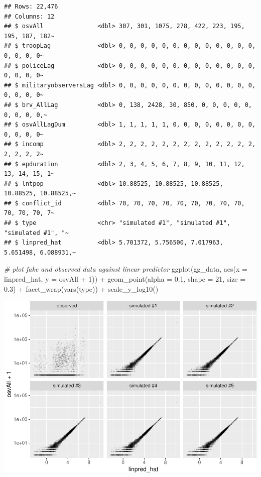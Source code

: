 \documentclass[
]{book}
\newenvironment{Shaded}{\begin{snugshade}}{\end{snugshade}}
\newcommand{\AttributeTok}[1]{\textcolor[rgb]{0.77,0.63,0.00}{#1}}
\newcommand{\CommentTok}[1]{\textcolor[rgb]{0.56,0.35,0.01}{\textit{#1}}}
\newcommand{\DecValTok}[1]{\textcolor[rgb]{0.00,0.00,0.81}{#1}}
\newcommand{\FloatTok}[1]{\textcolor[rgb]{0.00,0.00,0.81}{#1}}
\newcommand{\FunctionTok}[1]{\textcolor[rgb]{0.00,0.00,0.00}{#1}}
\newcommand{\NormalTok}[1]{#1}
\newcommand{\SpecialCharTok}[1]{\textcolor[rgb]{0.00,0.00,0.00}{#1}}
\begin{document}
\begin{verbatim}
## Rows: 22,476
## Columns: 12
## $ osvAll               <dbl> 307, 301, 1075, 278, 422, 223, 195, 195, 187, 182~
## $ troopLag             <dbl> 0, 0, 0, 0, 0, 0, 0, 0, 0, 0, 0, 0, 0, 0, 0, 0, 0~
## $ policeLag            <dbl> 0, 0, 0, 0, 0, 0, 0, 0, 0, 0, 0, 0, 0, 0, 0, 0, 0~
## $ militaryobserversLag <dbl> 0, 0, 0, 0, 0, 0, 0, 0, 0, 0, 0, 0, 0, 0, 0, 0, 0~
## $ brv_AllLag           <dbl> 0, 138, 2428, 30, 850, 0, 0, 0, 0, 0, 0, 0, 0, 0,~
## $ osvAllLagDum         <dbl> 1, 1, 1, 1, 1, 0, 0, 0, 0, 0, 0, 0, 0, 0, 0, 0, 0~
## $ incomp               <dbl> 2, 2, 2, 2, 2, 2, 2, 2, 2, 2, 2, 2, 2, 2, 2, 2, 2~
## $ epduration           <dbl> 2, 3, 4, 5, 6, 7, 8, 9, 10, 11, 12, 13, 14, 15, 1~
## $ lntpop               <dbl> 10.88525, 10.88525, 10.88525, 10.88525, 10.88525,~
## $ conflict_id          <dbl> 70, 70, 70, 70, 70, 70, 70, 70, 70, 70, 70, 70, 7~
## $ type                 <chr> "simulated #1", "simulated #1", "simulated #1", "~
## $ linpred_hat          <dbl> 5.701372, 5.756500, 7.017963, 5.651498, 6.088931,~
\end{verbatim}

\begin{Shaded}
\begin{Highlighting}[]
\CommentTok{\# plot fake and observed data against linear predictor}
\FunctionTok{ggplot}\NormalTok{(gg\_data, }\FunctionTok{aes}\NormalTok{(}\AttributeTok{x =}\NormalTok{ linpred\_hat, }\AttributeTok{y =}\NormalTok{ osvAll }\SpecialCharTok{+} \DecValTok{1}\NormalTok{)) }\SpecialCharTok{+} 
  \FunctionTok{geom\_point}\NormalTok{(}\AttributeTok{alpha =} \FloatTok{0.1}\NormalTok{, }\AttributeTok{shape =} \DecValTok{21}\NormalTok{, }\AttributeTok{size =} \FloatTok{0.3}\NormalTok{) }\SpecialCharTok{+} 
  \FunctionTok{facet\_wrap}\NormalTok{(}\FunctionTok{vars}\NormalTok{(type)) }\SpecialCharTok{+} 
  \FunctionTok{scale\_y\_log10}\NormalTok{()}
\end{Highlighting}
\end{Shaded}

\includegraphics{03-04-predictive-distributions_files/figure-latex/unnamed-chunk-6-1.pdf}
\end{document}
